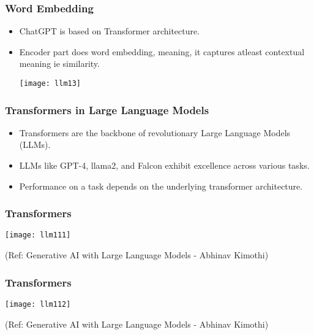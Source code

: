 \begin{frame}[fragile]\frametitle{Word Embedding}

\begin{itemize}
\item ChatGPT is based on Transformer architecture.
\item Encoder part does word embedding, meaning, it captures atleast contextual meaning ie similarity.

\begin{center}
\texttt{[image: llm13]}
\end{center}

\end{itemize}

\end{frame}

\begin{frame}[fragile]\frametitle{Transformers in Large Language Models}
\begin{itemize}
    \item Transformers are the backbone of revolutionary Large Language Models (LLMs).
    \item LLMs like GPT-4, llama2, and Falcon exhibit excellence across various tasks.
    \item Performance on a task depends on the underlying transformer architecture.
\end{itemize}
\end{frame}

\begin{frame}[fragile]\frametitle{Transformers}

	\begin{center}
	\texttt{[image: llm111]}
	\end{center}

	{\tiny (Ref: Generative AI with Large Language Models - Abhinav  Kimothi)}

\end{frame}

\begin{frame}[fragile]\frametitle{Transformers}

	\begin{center}
	\texttt{[image: llm112]}
	\end{center}

	{\tiny (Ref: Generative AI with Large Language Models - Abhinav  Kimothi)}

\end{frame}

